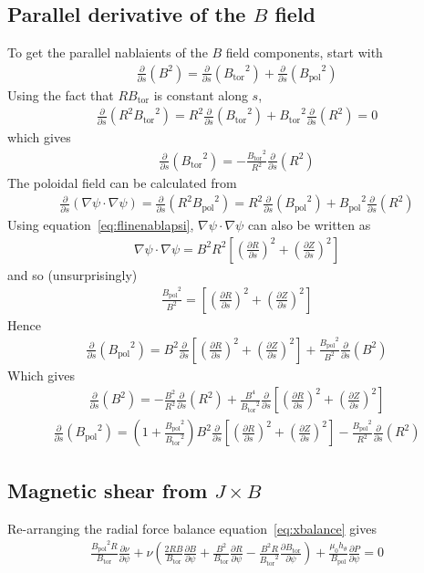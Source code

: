 \documentclass[12pt]{article}
\def\L{\left}
\def\R{\right}
\newcommand{\deriv}[2]{\ensuremath{\frac{\partial #1}{\partial #2}}}
\newcommand{\hthe}{\ensuremath{h_\theta}}
\newcommand{\Bp}{\ensuremath{B_{\text{pol}}}}
\newcommand{\Bt}{\ensuremath{B_{\text{tor}}}}
\begin{document}
\subsection{Parallel derivative of the \texorpdfstring{$B$}{B} field}
%
To get the parallel nablaients of the $B$ field components, start with
%
\begin{align*}
\deriv{}{s}\L(B^2\R) = \deriv{}{s}\L(\Bt^2\R) +
\deriv{}{s}\L(\Bp^2\R)
\end{align*}
%
Using the fact that $R\Bt$ is constant along $s$,
%
\begin{align*}
\deriv{}{s}\L(R^2\Bt^2\R) = R^2\deriv{}{s}\L(\Bt^2\R) +
\Bt^2\deriv{}{s}\L(R^2\R) = 0
\end{align*}
%
which gives
%
\begin{align*}
  \deriv{}{s}\L(\Bt^2\R) = -\frac{\Bt^2}{R^2}\deriv{}{s}\L(R^2\R)
\end{align*}
%
The poloidal field can be calculated from
%
\begin{align*}
\deriv{}{s}\L(\nabla\psi \cdot \nabla\psi\R) =
\deriv{}{s}\L(R^2\Bp^2\R) = R^2\deriv{}{s}\L(\Bp^2\R) +
\Bp^2\deriv{}{s}\L(R^2\R)
\end{align*}
%
Using equation~\ref{eq:flinenablapsi}, $\nabla\psi \cdot \nabla\psi$ can also be
written as
%
\begin{align*}
\nabla\psi \cdot \nabla\psi = B^2R^2\L[\L(\deriv{R}{s}\R)^2 +
\L(\deriv{Z}{s}\R)^2\R]
\end{align*}
%
and so (unsurprisingly)
%
\begin{align*}
\frac{\Bp^2}{B^2} = \L[\L(\deriv{R}{s}\R)^2 +
\L(\deriv{Z}{s}\R)^2\R]
\end{align*}
%
Hence
%
\begin{align*}
\deriv{}{s}\L(\Bp^2\R) = B^2\deriv{}{s}\L[\L(\deriv{R}{s}\R)^2
+ \L(\deriv{Z}{s}\R)^2\R] +
\frac{\Bp^2}{B^2}\deriv{}{s}\L(B^2\R)
\end{align*}
%
Which gives
%
\begin{align*}
\deriv{}{s}\L(B^2\R) = -\frac{B^2}{R^2}\deriv{}{s}\L(R^2\R) +
\frac{B^4}{\Bt^2}\deriv{}{s}\L[\L(\deriv{R}{s}\R)^2 +
\L(\deriv{Z}{s}\R)^2\R]
\end{align*}
%
\begin{align*}
\deriv{}{s}\L(\Bp^2\R) = \L(1 +
\frac{\Bp^2}{\Bt^2}\R)B^2\deriv{}{s}\L[\L(\deriv{R}{s}\R)^2 +
\L(\deriv{Z}{s}\R)^2\R] -
\frac{\Bp^2}{R^2}\deriv{}{s}\L(R^2\R)
\end{align*}
%



\subsection{Magnetic shear from \texorpdfstring{$J\times B$}{J x B}}
%
Re-arranging the radial force balance equation~\ref{eq:xbalance} gives
%
\begin{align*}
\frac{\Bp^2R}{\Bt}\deriv{\nu}{\psi} + \nu\L(\frac{2RB}{\Bt}\deriv{B}{\psi} +
\frac{B^2}{\Bt}\deriv{R}{\psi} - \frac{B^2R}{\Bt^2}\deriv{\Bt}{\psi}\R) +
\frac{\mu_0\hthe}{\Bp}\deriv{P}{\psi} = 0
\end{align*}
%
\end{document}
